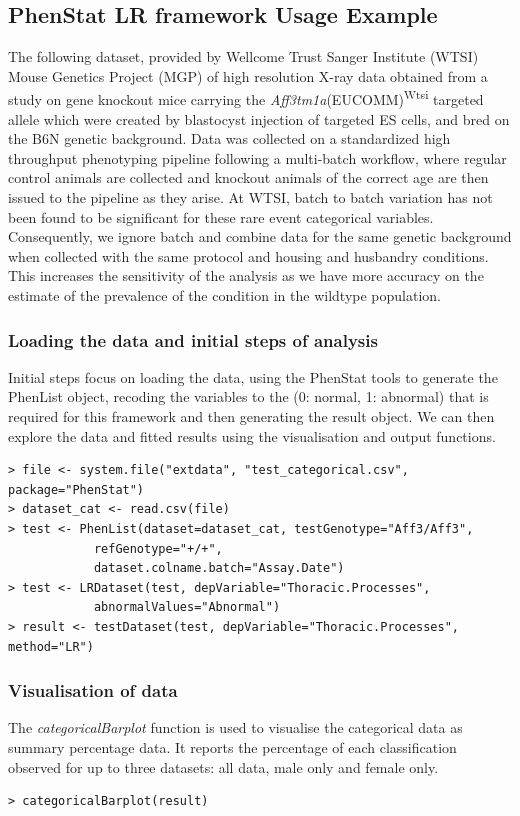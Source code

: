 \documentclass[12pt,a4paper]{article}
\begin{document}
\subsection{PhenStat LR framework Usage Example}
The following dataset, provided by Wellcome Trust Sanger Institute (WTSI) Mouse Genetics Project (MGP) of high resolution X-ray data obtained from a study on gene knockout mice carrying the \textit{Aff3tm1a}(EUCOMM)\textsuperscript{Wtsi} targeted allele which were created by blastocyst injection of targeted ES cells, and bred on the B6N genetic background. Data was collected on a standardized high throughput phenotyping pipeline following a multi-batch workflow, where regular control animals are collected and knockout animals of the correct age are then issued to the pipeline as they arise. At WTSI, batch to batch variation has not been found to be significant for these rare event categorical variables. Consequently, we ignore batch and combine data for the same genetic background when collected with the same protocol and housing and husbandry conditions. This increases the sensitivity of the analysis as we have more accuracy on the estimate of the prevalence of the condition in the wildtype population.
\subsubsection{Loading the data and initial steps of analysis}
Initial steps focus on loading the data, using the PhenStat tools to generate the PhenList object, recoding the variables to the (0: normal, 1: abnormal) that is required for this framework and then generating the result object. We can then explore the data and fitted results using the visualisation and output functions.

\begingroup
\fontsize{8pt}{12pt}\selectfont
\begin{verbatim}
> file <- system.file("extdata", "test_categorical.csv", package="PhenStat")
> dataset_cat <- read.csv(file)
> test <- PhenList(dataset=dataset_cat, testGenotype="Aff3/Aff3",
	 		refGenotype="+/+",
	 		dataset.colname.batch="Assay.Date")
> test <- LRDataset(test, depVariable="Thoracic.Processes",
			abnormalValues="Abnormal")
> result <- testDataset(test, depVariable="Thoracic.Processes", method="LR")
\end{verbatim}
\endgroup 
\subsubsection{Visualisation of data}
The \textit{categoricalBarplot} function is used to visualise the categorical data as summary  percentage data. It reports the percentage of each classification observed for up to three datasets: all data, male only and female only. 
\begingroup
\fontsize{8pt}{12pt}\selectfont
\begin{verbatim}
> categoricalBarplot(result)
\end{verbatim}
\endgroup 
\end{document}
